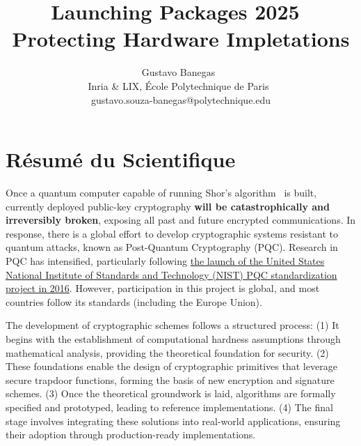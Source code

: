 \documentclass[11pt, a4paper]{article}
\begin{document}
\title{Launching Packages 2025~\\Protecting Hardware Impletations}
\author{Gustavo Banegas~\\
 Inria \& LIX, École Polytechnique de Paris~\\
 gustavo.souza-banegas@polytechnique.edu}
\date{}
\maketitle

\section{Résumé du Scientifique}

Once a quantum computer capable of running Shor’s algorithm~\cite{365700} is built, 
currently deployed public-key cryptography \textbf{will be catastrophically and irreversibly broken}, 
exposing all past and future encrypted communications. In response, there is a global effort to 
develop cryptographic systems resistant to quantum attacks, known as Post-Quantum Cryptography (PQC). 
Research in PQC has intensified, particularly following 
\href{https://csrc.nist.gov/projects/post-quantum-cryptography/post-quantum-cryptography-standardization/call-for-proposals}
{the launch of the United States National Institute of Standards and Technology (NIST) PQC standardization project in 2016}. 
However, participation in this project is global, and most countries follow its standards (including 
the Europe Union).

The development of cryptographic schemes follows a structured process: (1) It begins with the establishment of computational hardness assumptions through 
mathematical analysis, providing the theoretical foundation for security.
(2) These foundations enable the design of cryptographic primitives that leverage secure trapdoor functions, 
forming the basis of new encryption and signature schemes.
(3) Once the theoretical groundwork is laid, algorithms are formally specified and prototyped, leading to 
reference implementations. 
(4) The final stage involves integrating these solutions into real-world applications, ensuring their adoption 
through production-ready implementations.
\end{document}
